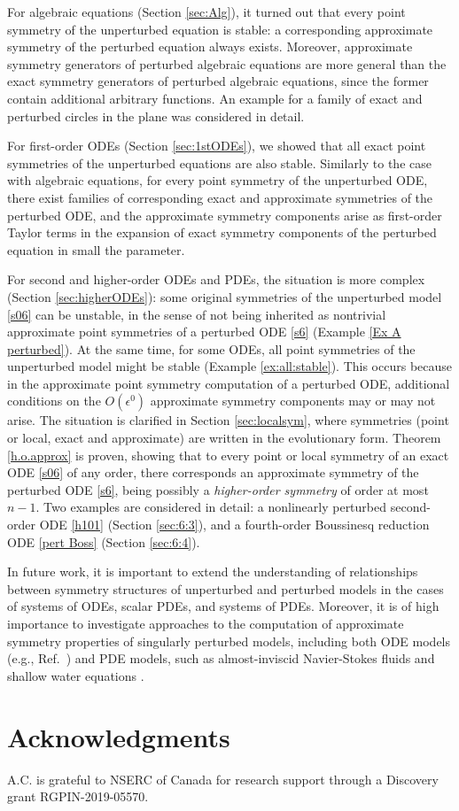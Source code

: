 \documentclass[11pt,letter,subeqn]{article}
\begin{document}
For algebraic equations (Section \ref{sec:Alg}), it turned out that every point symmetry of the unperturbed equation is stable: a corresponding approximate symmetry of the perturbed equation always exists. Moreover, approximate symmetry generators of perturbed algebraic equations are more general than the exact symmetry generators of perturbed algebraic equations, since the former contain additional arbitrary functions. An example for a family of exact and perturbed circles in the plane was considered in detail.

For first-order ODEs (Section \ref{sec:1stODEs}), we showed that all exact point symmetries of the unperturbed equations are also stable. Similarly to the case with algebraic equations, for every point symmetry of the unperturbed ODE, there exist families of corresponding exact and approximate symmetries of the perturbed ODE, and the approximate symmetry components arise as first-order Taylor terms in the expansion of exact symmetry components of the perturbed equation in small the parameter.

For second and higher-order ODEs and PDEs, the situation is more complex (Section \ref{sec:higherODEs}): some original symmetries of the unperturbed model \eqref{s06} can be unstable, in the sense of not being inherited as nontrivial approximate point symmetries of a perturbed ODE \eqref{s6} (Example \ref{Ex A perturbed}). At the same time, for some ODEs, all point symmetries of the unperturbed model might be stable (Example \ref{ex:all:stable}). This occurs because in the approximate point symmetry computation of a perturbed ODE, additional conditions on the $O(\epsilon^0)$ approximate symmetry components may or may not arise. The situation is clarified in Section \ref{sec:localsym}, where symmetries (point or local, exact and approximate) are written in the evolutionary form. Theorem \ref{h.o.approx} is proven, showing that to every point or local symmetry of an exact ODE \eqref{s06} of any order, there corresponds an approximate symmetry of the perturbed ODE \eqref{s6}, being possibly a \emph{higher-order symmetry} of order at most $n-1$. Two examples are considered in detail: a nonlinearly perturbed second-order ODE \eqref{h101} (Section \ref{sec:6:3}), and a fourth-order Boussinesq reduction ODE \eqref{pert Boss} (Section \ref{sec:6:4}).


\medskip
In future work, it is important to extend the understanding of relationships between symmetry structures of unperturbed and perturbed models in the cases of systems of ODEs, scalar PDEs, and systems of PDEs. Moreover, it is of high importance to investigate approaches to the computation of approximate symmetry properties of singularly perturbed models, including both ODE models (e.g., Ref.~\cite{o1991singular}) and PDE models, such as almost-inviscid Navier-Stokes fluids and shallow water equations \cite{Wh}.


\section*{Acknowledgments }
A.C. is grateful to NSERC of Canada for research support through a Discovery grant RGPIN-2019-05570.





{\footnotesize

}
\end{document}
